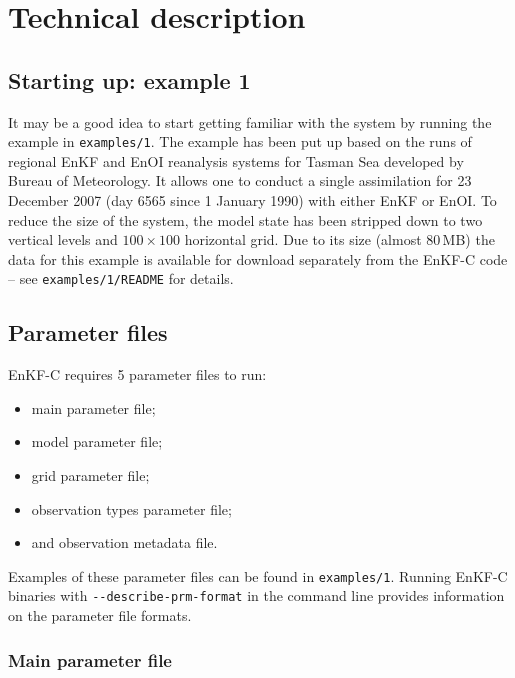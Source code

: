 \documentclass[11pt]{report}
\begin{document}
\chapter{Technical description}

\section{Starting up: example 1}
\label{example1}

It may be a good idea to start getting familiar with the system by running the example in \verb|examples/1|.
The example has been put up based on the runs of regional EnKF and EnOI reanalysis systems for Tasman Sea developed by Bureau of Meteorology. 
It allows one to conduct a single assimilation for 23 December 2007 (day 6565 since 1 January 1990) with either EnKF or EnOI.
To reduce the size of the system, the model state has been stripped down to two vertical levels and $100 \times 100$ horizontal grid.
Due to its size (almost 80\,MB) the data for this example is available for download separately from the EnKF-C code -- see \verb|examples/1/README| for details.

\section{Parameter files}

EnKF-C requires 5 parameter files to run:
\begin{itemize} 
\item main parameter file;
\item model parameter file;
\item grid parameter file;
\item observation types parameter file;
\item and observation metadata file.
\end{itemize}
Examples of these parameter files can be found in \verb|examples/1|.
Running EnKF-C binaries with \verb|--describe-prm-format| in the command line provides information on the parameter file formats.

\subsection{Main parameter file}
\end{document}
